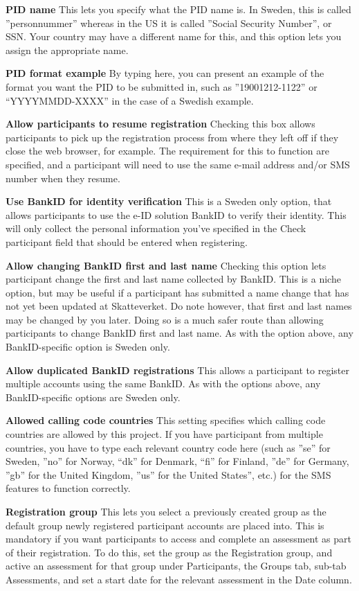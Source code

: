 \documentclass[
]{book}
\begin{document}
\textbf{PID name}
This lets you specify what the PID name is. In Sweden, this is called ''personnummer'' whereas in the US it is called ''Social Security Number'', or SSN. Your country may have a different name for this, and this option lets you assign the appropriate name.

\textbf{PID format example}
By typing here, you can present an example of the format you want the PID to be submitted in, such as ''19001212-1122'' or ``YYYYMMDD-XXXX'' in the case of a Swedish example.

\textbf{Allow participants to resume registration}
Checking this box allows participants to pick up the registration process from where they left off if they close the web browser, for example. The requirement for this to function are specified, and a participant will need to use the same e-mail address and/or SMS number when they resume.

\textbf{Use BankID for identity verification}
This is a Sweden only option, that allows participants to use the e-ID solution BankID to verify their identity. This will only collect the personal information you've specified in the Check participant field that should be entered when registering.

\textbf{Allow changing BankID first and last name}
Checking this option lets participant change the first and last name collected by BankID. This is a niche option, but may be useful if a participant has submitted a name change that has not yet been updated at Skatteverket. Do note however, that first and last names may be changed by you later. Doing so is a much safer route than allowing participants to change BankID first and last name. As with the option above, any BankID-specific option is Sweden only.

\textbf{Allow duplicated BankID registrations}
This allows a participant to register multiple accounts using the same BankID. As with the options above, any BankID-specific options are Sweden only.

\textbf{Allowed calling code countries}
This setting specifies which calling code countries are allowed by this project. If you have participant from multiple countries, you have to type each relevant country code here (such as ''se'' for Sweden, ''no'' for Norway, ``dk'' for Denmark, ``fi'' for Finland, ''de'' for Germany, ''gb'' for the United Kingdom, ''us'' for the United States'', etc.) for the SMS features to function correctly.

\textbf{Registration group}
This lets you select a previously created group as the default group newly registered participant accounts are placed into. This is mandatory if you want participants to access and complete an assessment as part of their registration.
To do this, set the group as the Registration group, and active an assessment for that group under Participants, the Groups tab, sub-tab Assessments, and set a start date for the relevant assessment in the Date column.
\end{document}
